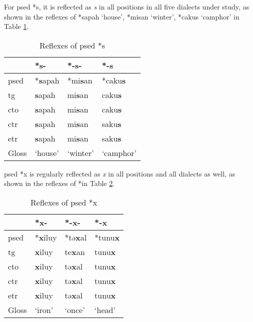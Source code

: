 For \acl{psed} *s, it is reflected as \textit{s} in all positions in all five dialects under study, as shown in the reflexes of *sapah `house', *misan `winter', *cakus `camphor' in Table \ref{tab:psed_s}.

\begin{table}[!htbp]
\centering
\caption{Reflexes of \acl{psed} *s}
\label{tab:psed_s}
\begin{tabular}{llll}
\hline
           & *s-     & *-s-     & *-s       \\ \hline
\acs{psed} & *\textbf{s}apah  & *mi\textbf{s}an   & *caku\textbf{s}    \\ \hdashline
\acs{tg}   & \textbf{s}apah   & mi\textbf{s}an    & caku\textbf{s}     \\
\acs{cto}  & \textbf{s}apah   & mi\textbf{s}an    & caku\textbf{s}     \\
\acs{ctr}  & \textbf{s}apah   & mi\textbf{s}an    & saku\textbf{s}     \\
\acs{etr}  & \textbf{s}apah   & mi\textbf{s}an    & saku\textbf{s}     \\ \hline
Gloss      & `house' & `winter' & `camphor' \\ \hline
\end{tabular}
\end{table}

\acl{psed} *x is regularly reflected as \textit{x} in all positions and all dialects as well, as shown in the reflexes of *in Table \ref{tab:psed_x}. 

\begin{table}[!htbp]
\centering
\caption{Reflexes of \acl{psed} *x}
\label{tab:psed_x}
\begin{tabular}{llll}
\hline
           & *x-    & *-x-   & *-x    \\ \hline
\acs{psed} & *\textbf{x}iluy & *tə\textbf{x}al & *tunu\textbf{x} \\ \hdashline
\acs{tg}   & \textbf{x}iluy  & te\textbf{x}an  & tunu\textbf{x}  \\
\acs{cto}  & \textbf{x}iluy  & tə\textbf{x}al  & tunu\textbf{x}  \\
\acs{ctr}  & \textbf{x}iluy  & tə\textbf{x}al  & tunu\textbf{x}  \\
\acs{etr}  & \textbf{x}iluy  & tə\textbf{x}al  & tunu\textbf{x}  \\ \hline
Gloss      & `iron' & `once' & `head' \\ \hline
\end{tabular}
\end{table}

